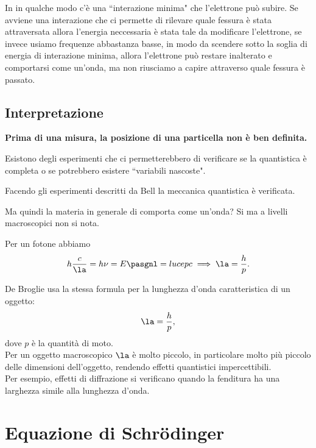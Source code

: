 In in qualche modo c'\`e una ``interazione minima" che l'elettrone pu\`o subire. Se avviene una interazione che ci permette di rilevare quale fessura \`e stata attraversata allora l'energia neccessaria \`e stata tale da modificare l'elettrone, se invece usiamo frequenze abbastanza basse, in modo da scendere sotto la soglia di energia di interazione minima, allora l'elettrone pu\`o restare inalterato e comportarsi come un'onda, ma non riusciamo a capire attraverso quale fessura \`e passato.

\subsection{Interpretazione}
\begin{fact}
\textbf{Prima di una misura, la posizione di una particella non \`e ben definita.}
\end{fact}

\begin{theorem}[Bell]
Esistono degli esperimenti che ci permetterebbero di verificare se la quantistica \`e completa o se potrebbero esistere ``variabili nascoste". 
\end{theorem}
\begin{fact}
Facendo gli esperimenti descritti da Bell la meccanica quantistica \`e verificata.
\end{fact}


\noindent
Ma quindi la materia in generale di comporta come un'onda? Si ma a livelli macroscopici non si nota. 

\begin{remark}
Per un fotone abbiamo
\[h\frac c\la=h\nu=E\pasgnl={luce}pc\implies \la=\frac hp.\]
\end{remark}

\noindent
De Broglie usa la stessa formula per la lunghezza d'onda caratteristica di un oggetto:
\[\la=\frac hp,\]
dove $p$ \`e la quantit\`a di moto.\\
Per un oggetto macroscopico $\la$ \`e molto piccolo, in particolare molto pi\`u piccolo delle dimensioni dell'oggetto, rendendo effetti quantistici impercettibili.\\
Per esempio, effetti di diffrazione si verificano quando la fenditura ha una larghezza simile alla lunghezza d'onda.



\section{Equazione di Schr\"odinger}

